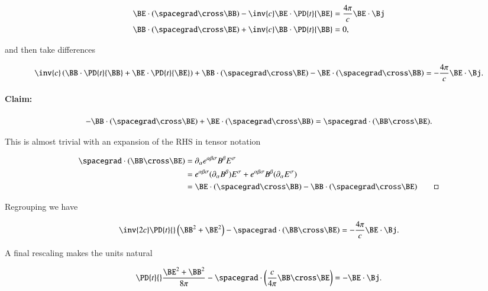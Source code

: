 \begin{align}\label{eqn:relativisticElectrodynamicsL16:550}
\BE \cdot (\spacegrad \cross \BB) -\inv{c} \BE \cdot \PD{t}{\BE} &= \frac{4 \pi}{c} \BE \cdot \Bj \\
\BB \cdot (\spacegrad \cross \BE) +\inv{c} \BB \cdot \PD{t}{\BB} &= 0,
\end{align}

and then take differences

\begin{equation}\label{eqn:relativisticElectrodynamicsL16:570}
\inv{c} \left(
\BB \cdot \PD{t}{\BB}
+ \BE \cdot \PD{t}{\BE} \right) + \BB \cdot (\spacegrad \cross \BE) -\BE \cdot (\spacegrad \cross \BB) =
-\frac{4 \pi}{c} \BE \cdot \Bj.
\end{equation}

\paragraph{Claim:}

\begin{equation}\label{eqn:relativisticElectrodynamicsL16:590}
-\BB \cdot (\spacegrad \cross \BE) +\BE \cdot (\spacegrad \cross \BB) = \spacegrad \cdot ( \BB \cross \BE ).
\end{equation}

This is almost trivial with an expansion of the RHS in tensor notation

\begin{align*}
\spacegrad \cdot ( \BB \cross \BE )
&=
\partial_\alpha e^{\alpha \beta \sigma} B^\beta E^\sigma \\
&=
e^{\alpha \beta \sigma} (\partial_\alpha B^\beta) E^\sigma
+
e^{\alpha \beta \sigma} B^\beta (\partial_\alpha E^\sigma) \\
&=
\BE \cdot (\spacegrad \cross \BB)
-\BB \cdot (\spacegrad \cross \BE)\qquad \square
\end{align*}

Regrouping we have

\begin{equation}\label{eqn:relativisticElectrodynamicsL16:610}
\inv{2 c} \PD{t}{} \left(
\BB^2 + \BE^2 \right) - \spacegrad \cdot ( \BB \cross \BE )
=
-\frac{4 \pi}{c} \BE \cdot \Bj.
\end{equation}

A final rescaling makes the units natural

\begin{equation}\label{eqn:relativisticElectrodynamicsL16:630}
\PD{t}{} \frac{ \BE^2 + \BB^2 }{8 \pi} - \spacegrad \cdot \left( \frac{c}{4 \pi} \BB \cross \BE \right) = - \BE \cdot \Bj.
\end{equation}

